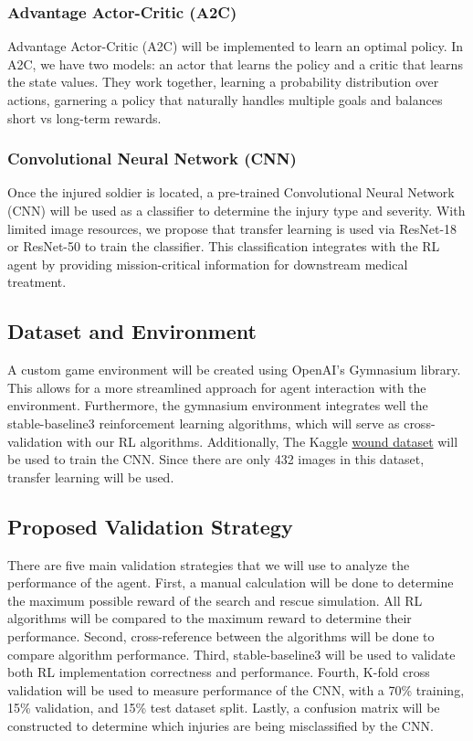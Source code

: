 \documentclass[12pt]{article}
\begin{document}
\subsubsection*{Advantage Actor-Critic (A2C)}
Advantage Actor-Critic (A2C) will be implemented to learn an optimal policy. In A2C, we have two models: an actor that learns the policy and a critic that learns the state values. They work together, learning a probability distribution over actions, garnering a policy that naturally handles multiple goals and balances short vs long-term rewards.

\subsubsection*{Convolutional Neural Network (CNN)}

Once the injured soldier is located, a pre-trained Convolutional Neural Network (CNN) will be used as a classifier to determine the injury type and severity. With limited image resources, we propose that transfer learning is used via ResNet-18 or ResNet-50 to train the classifier. This classification integrates with the RL agent by providing mission-critical information for downstream medical treatment.

\subsection*{Dataset and Environment}
A custom game environment will be created using OpenAI's Gymnasium library. This allows for a more streamlined approach for agent interaction with the environment. Furthermore, the gymnasium environment integrates well the stable-baseline3 reinforcement learning algorithms, which will serve as cross-validation with our RL algorithms. Additionally, The Kaggle \href{https://www.kaggle.com/datasets/yasinpratomo/wound-dataset}{wound dataset} will be used to train the CNN. Since there are only 432 images in this dataset, transfer learning will be used.

\subsection*{Proposed Validation Strategy}
There are five main validation strategies that we will use to analyze the performance of the agent. First, a manual calculation will be done to determine the maximum possible reward of the search and rescue simulation. All RL algorithms will be compared to the maximum reward to determine their performance. Second, cross-reference between the algorithms will be done to compare algorithm performance. Third, stable-baseline3 will be used to validate both RL implementation correctness and performance. Fourth, K-fold cross validation will be used to measure performance of the CNN, with a 70\% training, 15\% validation, and 15\% test dataset split. Lastly, a confusion matrix will be constructed to determine which injuries are being misclassified by the CNN.
\end{document}
